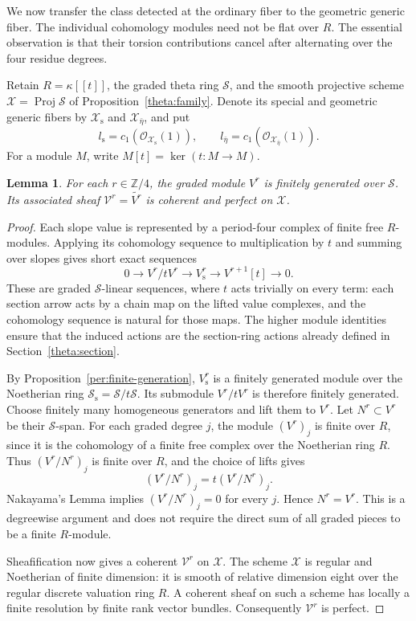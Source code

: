 \documentclass[11pt]{article}
\newtheorem{lemma}[theorem]{Lemma}
\theoremstyle{definition}
\theoremstyle{remark}
\numberwithin{equation}{section}
\begin{document}
We now transfer the class detected at the ordinary fiber to the geometric
generic fiber.  The individual cohomology modules need not be flat over
$R$.  The essential observation is that their torsion contributions
cancel after alternating over the four residue degrees.

Retain $R=\kappa[[t]]$, the graded theta ring $\mathscr S$, and the smooth
projective scheme $\mathscr X=\operatorname{Proj}\mathscr S$ of
Proposition~\ref{theta:family}.  Denote its special and geometric generic
fibers by $\mathscr X_{\mathrm s}$ and $\mathscr X_{\bar\eta}$,
and put
\[
 l_{\mathrm s}=c_1(\mathcal O_{\mathscr X_{\mathrm s}}(1)),\qquad
 l_{\bar\eta}=c_1(\mathcal O_{\mathscr X_{\bar\eta}}(1)).
\]
For a module $M$, write $M[t]=\ker(t:M\to M)$.

\begin{lemma}
\label{lift:finite-generation}
For each $r\in\mathbb Z/4$, the graded module $V^r$ is finitely generated over
$\mathscr S$.  Its associated sheaf $\mathcal V^r=\widetilde{V^r}$ is
coherent and perfect on $\mathscr X$.
\end{lemma}

\begin{proof}
Each slope value is represented by a period-four complex of finite free
$R$-modules.  Applying its cohomology sequence to multiplication by $t$
and summing over slopes gives short exact sequences
\begin{equation}
 0\longrightarrow V^r/tV^r\longrightarrow V_{\mathrm s}^r
  \longrightarrow V^{r+1}[t]\longrightarrow0.
 \label{lift:cohomology-sequence}
\end{equation}
These are graded $\mathscr S$-linear sequences, where $t$ acts trivially
on every term: each section arrow acts by a chain map on the lifted
value complexes, and the cohomology sequence is natural for those maps.
The higher module identities ensure that the induced actions are the
section-ring actions already defined in Section~\ref{theta:section}.

By Proposition~\ref{per:finite-generation}, $V_{\mathrm s}^r$ is a
finitely generated module over the Noetherian ring
$\mathscr S_{\mathrm s}=\mathscr S/t\mathscr S$.
Its submodule $V^r/tV^r$ is therefore finitely generated.  Choose finitely
many homogeneous generators and lift them to $V^r$.  Let $N^r\subset V^r$
be their $\mathscr S$-span.  For each graded degree $j$, the module
$(V^r)_j$ is finite over $R$, since it is the cohomology of a finite
free complex over the Noetherian ring $R$.  Thus $(V^r/N^r)_j$ is finite
over $R$, and the choice of lifts gives
\[
 (V^r/N^r)_j=t(V^r/N^r)_j.
\]
Nakayama's Lemma implies $(V^r/N^r)_j=0$ for every $j$.  Hence $N^r=V^r$.
This is a degreewise argument and does not require the direct sum of all
graded pieces to be a finite $R$-module.

Sheafification now gives a coherent $\mathcal V^r$ on $\mathscr X$.
The scheme $\mathscr X$ is regular and Noetherian of finite dimension:
it is smooth of relative dimension eight over the regular discrete
valuation ring $R$.  A coherent sheaf on such a scheme has locally a
finite resolution by finite rank vector bundles.  Consequently
$\mathcal V^r$ is perfect.
\end{proof}
\end{document}
